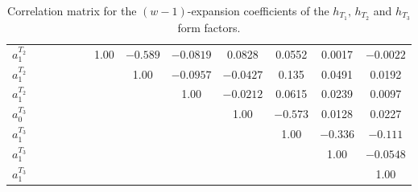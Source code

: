 \documentclass[aps,superscriptaddress,showpacs,nofootinbib,11pt]{revtex4-1}
\begin{document}
\begin{table}[h]
\begin{ruledtabular}
\begin{center}
\begin{tabular}{ccccccccccccc}
$a_1^{{T_2}}$&&&&&&1.00&  $-0.589$&  $-0.0819$&   \hspace{.25cm}0.0828 &  \hspace{.25cm}0.0552  & \hspace{.25cm}0.0017 & $-0.0022$\\
$a_1^{{T_2}}$&&&&&&&1.00&  $-0.0957$&  $-0.0427$ &  \hspace{.25cm}0.135 &  \hspace{.25cm}0.0491 &  \hspace{.25cm}0.0192\\
$a_1^{{T_2}}$&&&&&&&&1.00&  $-0.0212$&   \hspace{.25cm}0.0615 &  \hspace{.25cm}0.0239  & \hspace{.25cm}0.0097\\
$a_0^{{T_3}}$&&&&&&&&&1.00&  $-0.573$&   \hspace{.25cm}0.0128  & \hspace{.25cm}0.0227\\
$a_1^{{T_3}}$&&&&&&&&&&1.00 & $-0.336$ & $-0.111$\\
$a_1^{{T_3}}$&&&&&&&&&&&1.00 & $-0.0548$\\
$a_1^{{T_3}}$&&&&&&&&&&&&1.00\\
\end{tabular}
    \caption{Correlation matrix for the $(w-1)$-expansion coefficients of the $h_{T_1},\,h_{T_2}$ and $h_{T_3}$ form factors. }
   \label{tab:ht123ht123}
   \end{center}
   \end{ruledtabular}
\end{table}
\end{document}
